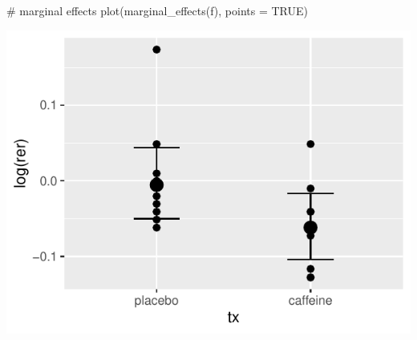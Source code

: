 \begin{Schunk}
\begin{Sinput}
# marginal effects 
plot(marginal_effects(f), points = TRUE)
\end{Sinput}


\centerline{\includegraphics[width=\maxwidth]{htest-bayesfit2d-1} }

\end{Schunk}

